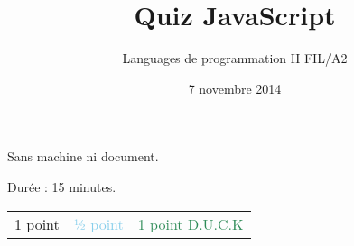 \documentclass[a4paper, 12pt]{article}
\title{Quiz JavaScript}
\author{Languages de programmation II FIL/A2}
\date{7 novembre 2014}
\newcommand{\fullpoint}[1]{\textcolor{RubineRed}{#1}}
\newcommand{\halfpoint}[1]{\textcolor{SkyBlue}{#1}}
\newcommand{\jedipoint}[1]{\textcolor{SeaGreen}{#1}}
\begin{document}
\maketitle


Sans machine ni document.

Durée : 15 minutes.


\begin{center}
\begin{tabular}{lll}
 \fullpoint{1 point}  &  \halfpoint{½ point}  &  \jedipoint{1 point D.U.C.K}  \\
\end{tabular}
\end{center}
\end{document}
